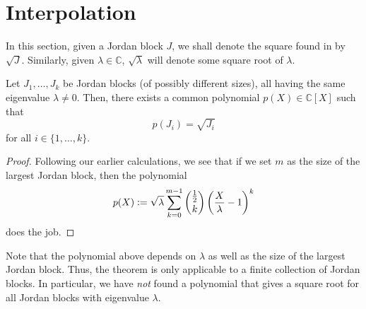 \documentclass[12pt]{article}
\begin{document}
\section{Interpolation}

In this section, given a Jordan block $J$, we shall denote the square found in  by $\sqrt{J}$. Similarly, given $\lambda \in \mathbb{C}$, $\sqrt{\lambda}$ will denote some square root of $\lambda$.

\begin{thm} \label{thm:common-polynomial-same-eigenvalue}
	Let $J_{1}, \ldots, J_{k}$ be Jordan blocks (of possibly different sizes), all having the same eigenvalue $\lambda \neq 0$. Then, there exists a common polynomial $p(X) \in \mathbb{C}[X]$ such that
	\begin{equation*} 
		p(J_{i}) = \sqrt{J_{i}}
	\end{equation*}
	for all $i \in \{1, \ldots, k\}$. 
\end{thm}
\begin{proof} 
	Following our earlier calculations, we see that if we set $m$ as the size of the largest Jordan block, then the polynomial
	\begin{equation*} 
		p(X) \vcentcolon= \sqrt{\lambda} \sum_{k = 0}^{m - 1} \binom{\frac{1}{2}}{k} \left(\frac{X}{\lambda} - 1\right)^{k}
	\end{equation*}
	does the job.
\end{proof}

\begin{rem}
	Note that the polynomial above depends on $\lambda$ as well as the size of the largest Jordan block. Thus, the theorem is only applicable to a finite collection of Jordan blocks. In particular, we have \emph{not} found a polynomial that gives a square root for all Jordan blocks with eigenvalue $\lambda$.
\end{rem}
\end{document}
